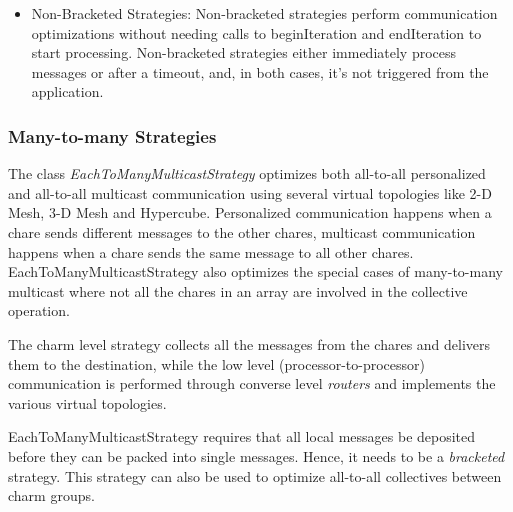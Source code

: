 {\begin{itemize}
\begin{alltt}
ComlibEnd(dproxy);
\end{alltt}

\item Non-Bracketed Strategies: Non-bracketed strategies perform communication
optimizations without needing calls to beginIteration and endIteration to start
processing. Non-bracketed strategies either immediately process messages or
after a timeout, and, in both cases, it's not triggered from the application.

\end{itemize}


\subsubsection{Many-to-many Strategies}

The class {\em EachToManyMulticastStrategy} optimizes both all-to-all
personalized and all-to-all multicast communication using several virtual
topologies like 2-D Mesh, 3-D Mesh and Hypercube. Personalized communication
happens when a chare sends different messages to the other chares, multicast
communication happens when a chare sends the same message to all other chares.
EachToManyMulticastStrategy also optimizes the special cases of many-to-many multicast where
not all the chares in an array are involved in the collective operation.

The charm level strategy collects all the messages from the chares and delivers
them to the destination, while the low level (processor-to-processor)
communication is performed through converse level {\em routers} and
implements the various virtual topologies.



EachToManyMulticastStrategy requires that all local messages be deposited
before they can be packed into single messages. Hence, it needs to be a {\em
bracketed} strategy. This strategy can also be used to optimize all-to-all collectives between charm
groups.

}
